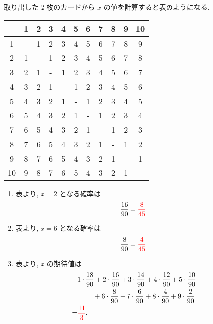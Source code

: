 取り出した 2 枚のカードから $x$ の値を計算すると表のようになる.
\begin{table}[H]
	\centering
	\begin{tabular}{c|cccccccccc}
		   & 1 & 2 & 3 & 4 & 5 & 6 & 7 & 8 & 9 & 10 \\ \hline
		 1 & - & 1 & 2 & 3 & 4 & 5 & 6 & 7 & 8 &  9 \\
		 2 & 1 & - & 1 & 2 & 3 & 4 & 5 & 6 & 7 &  8 \\
		 3 & 2 & 1 & - & 1 & 2 & 3 & 4 & 5 & 6 &  7 \\
		 4 & 3 & 2 & 1 & - & 1 & 2 & 3 & 4 & 5 &  6 \\
		 5 & 4 & 3 & 2 & 1 & - & 1 & 2 & 3 & 4 &  5 \\
		 6 & 5 & 4 & 3 & 2 & 1 & - & 1 & 2 & 3 &  4 \\
		 7 & 6 & 5 & 4 & 3 & 2 & 1 & - & 1 & 2 &  3 \\
		 8 & 7 & 6 & 5 & 4 & 3 & 2 & 1 & - & 1 &  2 \\
		 9 & 8 & 7 & 6 & 5 & 4 & 3 & 2 & 1 & - &  1 \\
		10 & 9 & 8 & 7 & 6 & 5 & 4 & 3 & 2 & 1 &  - \\
	\end{tabular}
\end{table}
\begin{enumerate}
	\item{
		表より, $x = 2$ となる確率は
		\begin{align}
			\frac{16}{90} = \textcolor{red}{\frac{8}{45}}.
		\end{align}
	}
	\item{
		表より, $x = 6$ となる確率は
		\begin{align}
			\frac{8}{90} = \textcolor{red}{\frac{4}{45}}.
		\end{align}
	}
	\item{
		表より, $x$ の期待値は
		\begin{align}
			&1\cdot\frac{18}{90} + 2\cdot\frac{16}{90} + 3\cdot\frac{14}{90} + 4\cdot\frac{12}{90} + 5\cdot\frac{10}{90} \\
				&\textbf{\quad\quad} + 6\cdot\frac{8}{90} + 7\cdot\frac{6}{90} + 8\cdot\frac{4}{90} + 9\cdot\frac{2}{90} \\
			=& \textcolor{red}{\frac{11}{3}}.
		\end{align}
	}
\end{enumerate}